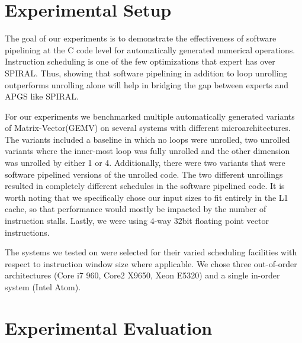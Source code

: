 \documentclass[10pt]{article}
\begin{document}
\section{Experimental Setup}

The goal of our experiments is to demonstrate the effectiveness of software
pipelining at the C code level for automatically generated numerical
operations. Instruction scheduling is one of the few optimizations that expert
has over SPIRAL. Thus, showing that software pipelining in addition to loop
unrolling outperforms unrolling alone will help in bridging the gap between
experts and APGS like SPIRAL.

For our experiments we benchmarked multiple automatically generated variants
of Matrix-Vector(GEMV) on several systems with different
microarchitectures. The variants included a baseline in which no loops were
unrolled, two unrolled variants where the inner-most loop was fully unrolled
and the other dimension was unrolled by either 1 or 4. Additionally, there
were two variants that were software pipelined versions of the unrolled
code. The two different unrollings resulted in completely different schedules
in the software pipelined code. It is worth noting that we specifically chose
our input sizes to fit entirely in the L1 cache, so that performance would
mostly be impacted by the number of instruction stalls. Lastly, we were using
4-way 32bit floating point vector instructions.

The systems we tested on were selected for their varied scheduling
facilities with respect to instruction window size where applicable. We chose three
out-of-order architectures (Core i7 960, Core2 X9650, Xeon E5320) and a single
in-order system (Intel Atom).


\section{Experimental Evaluation}
\end{document}
